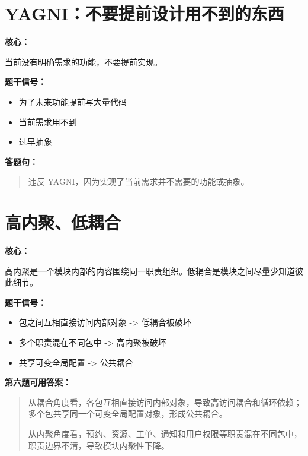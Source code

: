 \documentclass[UTF8,zihao=-4]{ctexart}
\newcommand{\principle}[1]{%
  \section*{\color{TitleBlue}#1}
}
\newcommand{\labeltext}[1]{%
  \textbf{#1}
}
\newenvironment{answerbox}{%
  \begin{quote}\small\color{TextGray}
}{%
  \end{quote}
}
\begin{document}
\principle{YAGNI：不要提前设计用不到的东西}

\labeltext{核心：}
当前没有明确需求的功能，不要提前实现。

\labeltext{题干信号：}
\begin{itemize}
  \item 为了未来功能提前写大量代码
  \item 当前需求用不到
  \item 过早抽象
\end{itemize}

\labeltext{答题句：}
\begin{answerbox}
违反 YAGNI，因为实现了当前需求并不需要的功能或抽象。
\end{answerbox}

\principle{高内聚、低耦合}

\labeltext{核心：}
高内聚是一个模块内部的内容围绕同一职责组织。低耦合是模块之间尽量少知道彼此细节。

\labeltext{题干信号：}
\begin{itemize}
  \item 包之间互相直接访问内部对象 -> 低耦合被破坏
  \item 多个职责混在不同包中 -> 高内聚被破坏
  \item 共享可变全局配置 -> 公共耦合
\end{itemize}

\labeltext{第六题可用答案：}
\begin{answerbox}
从耦合角度看，各包互相直接访问内部对象，导致高访问耦合和循环依赖；多个包共享同一个可变全局配置对象，形成公共耦合。

从内聚角度看，预约、资源、工单、通知和用户权限等职责混在不同包中，职责边界不清，导致模块内聚性下降。
\end{answerbox}
\end{document}
